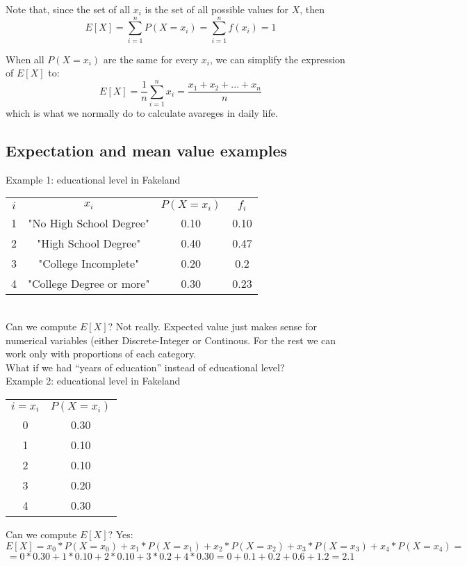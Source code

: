 \documentclass[11pt]{article}
\begin{document}
	Note that, since the set of all $x_i$ is the set of all possible values for $X$, then
	\[E[X] = \sum\limits_{i=1}^n P(X = x_i) = \sum\limits_{i=1}^n f(x_i) = 1\]

	When all $P(X=x_i)$ are the same for every $x_i$, we can simplify the expression of $E[X]$ to:
	\[E[X] = \frac{1}{n}\sum\limits_{i=1}^n x_i = \frac{x_1 + x_2 + ... + x_n}{n}\]
	which is what we normally do to calculate avareges in daily life.

	\subsection*{Expectation and mean value examples}

	Example 1: educational level in Fakeland

\begin{tabular}{|c|c|c|c|}
\hline
	$i$ & $x_i$ & $P(X=x_i)$ & $f_i$\\
	\cline{1-4}
	1 & "No High School Degree" & 0.10 & 0.10\\
	2 & "High School Degree" & 0.40 & 0.47\\
	3 & "College Incomplete" & 0.20 & 0.2\\
	4 & "College Degree or more" & 0.30 & 0.23\\	
\hline
\end{tabular}\newline\\

	Can we compute $E[X]$? Not really. Expected value just makes sense for numerical variables (either Discrete-Integer or Continous. For the rest we can work only with proportions of each category.\\
	
	What if we had ``years of education'' instead of educational level?\\
	
	Example 2: educational level in Fakeland
	
		\begin{tabular}{|c|c|}
\hline
	$i = x_i$ & $P(X=x_i)$\\
	\cline{1-2}
	0 & 0.30\\
	1 & 0.10\\
	2 & 0.10\\
	3 & 0.20\\
	4 & 0.30\\
\hline
\end{tabular}

Can we compute $E[X]$? Yes:
\[ E[X] = x_0 * P(X = x_0)+ x_1 * P(X = x_1) + x_2 * P(X = x_2) + x_3 * P(X = x_3) + x_4 * P(X = x_4) = \]
\[ = 0 * 0.30 + 1 * 0.10 + 2 * 0.10 + 3 * 0.2 + 4 * 0.30  = 0 + 0.1 + 0.2 + 0.6 + 1.2 = 2.1\]
	
\end{document}
